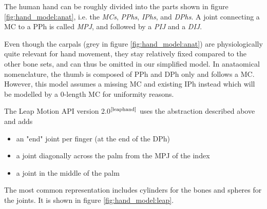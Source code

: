 \documentclass[hyperref, bachelorofscience]{cgvpub}
\newcommand{\newcite}[1]{$ ^{\text{\cite{#1}}} $}
\begin{document}
The human hand can be roughly divided into the parts shown in figure \ref{fig:hand_model:anat}, i.e. the \emph{\glspl{MC}}, \emph{\glspl{PPh}}, \emph{\glspl{IPh}}, and \emph{\glspl{DPh}}. A joint connecting a \gls{MC} to a \gls{PPh} is called \emph{\gls{MPJ}}, and followed by a \emph{\gls{PIJ}} and a \emph{\gls{DIJ}}.

Even though the carpals (grey in figure \ref{fig:hand_model:anat}) are physiologically quite relevant for hand movement, they stay relatively fixed compared to the other bone sets, and can thus be omitted in our simplified model. In anataomical nomenclature, the thumb is composed of \gls{PPh} and \gls{DPh} only and follows a \gls{MC}. However, this model assumes a missing \gls{MC} and existing \gls{IPh} instead which will be modelled by a 0-length \gls{MC} for uniformity reasons.

The Leap Motion API version 2.0\newcite{leaphand} uses the abstraction described above and adds
\begin{itemize}
	\item an "end" joint per finger (at the end of the \gls{DPh})
	\item a joint diagonally across the palm from the \gls{MPJ} of the index
	\item a joint in the middle of the palm
\end{itemize}

The most common representation includes cylinders for the bones and spheres for the joints. It is shown in figure \ref{fig:hand_model:leap}.
\end{document}
